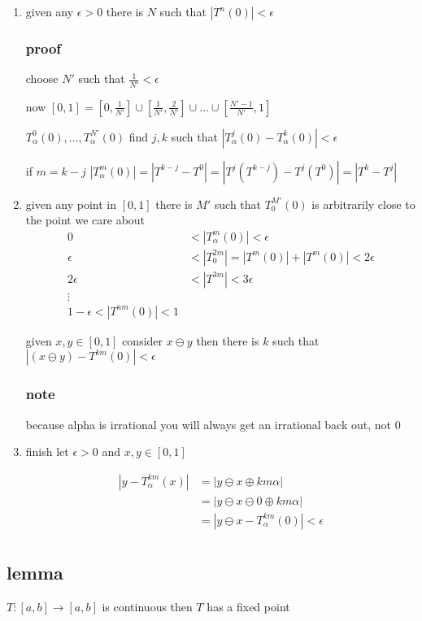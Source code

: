 \documentclass[letterpaper]{article}
\begin{document}
\begin{enumerate}
\item
given any $\epsilon>0$ there is $N$ such that $|T^n(0)|<\epsilon$
\subsubsection*{proof}
choose $N'$ such that $\frac{1}{N'}<\epsilon$

now $[0,1]=[0,\frac{1}{N'}]\cup[\frac{1}{N'},\frac{2}{N'}]\cup\dots\cup[\frac{N'-1}{N'},1]$


$T^0_\alpha(0),\dots,T^{N'}_\alpha(0)$ find $j,k$ such that $|T^j_\alpha(0)-T^k_\alpha(0)|<\epsilon$

if $m=k-j$ $|T^m_\alpha(0)|=|T^{k-j}-T^{0}|=|T^{j}(T^{k-j})-T^j(T^0)|=|T^k-T^j|$
\item
given any point in $[0,1]$ there is $M'$ such that $T^{M'}_0(0)$ is arbitrarily close to the point we care about
\begin{align*}
  0&<|T_\alpha^m(0)|<\epsilon\\
  \epsilon&<|T^{2m}_0|=|T^m(0)|+|T^m(0)|<2\epsilon\\
  2\epsilon&<|T^{3m}|<3\epsilon\\
  \vdots\\
  1-\epsilon<|T^{nm}(0)|<1
\end{align*}

given $x,y\in [0,1]$ consider $x\ominus y$ then there is $k$ such that $|(x\ominus y)-T^{km}(0)|<\epsilon$
\subsubsection*{note} because alpha is irrational you will always get an irrational back out, not 0
\item
finish
let $\epsilon>0$ and $x,y\in [0,1]$

\begin{align*}
  |y-T^{km}_\alpha(x)|&=|y\ominus x\oplus km\alpha|\\
  &=|y\ominus x\ominus 0\oplus km\alpha|\\
  &=|y\ominus x - T^{km}_\alpha(0)|<\epsilon\\
\end{align*}
\end{enumerate}

\subsection*{lemma}
$T:[a,b]\to[a,b]$ is continuous then $T$ has a fixed point
\end{document}
